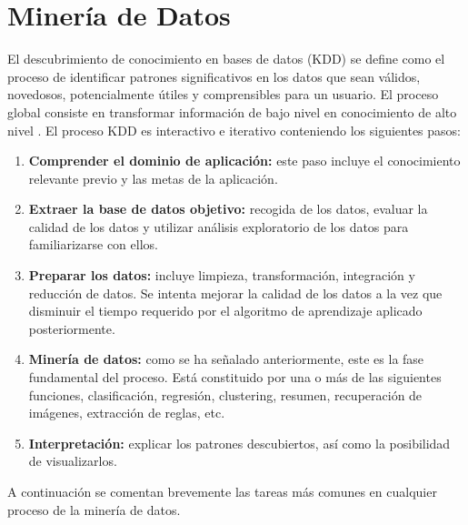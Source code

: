 \section{Minería de Datos}
El descubrimiento de conocimiento en bases de datos (KDD) se define como el proceso de identificar patrones significativos 
en los datos que sean válidos, novedosos, potencialmente útiles y comprensibles para un usuario. El proceso global consiste 
en transformar información de bajo nivel en conocimiento de alto nivel \cite{riquelme2006mineria}. El proceso KDD es interactivo e iterativo conteniendo
los siguientes pasos:
\begin{enumerate}
 \item \textbf{Comprender el dominio de aplicación:} este paso incluye el conocimiento relevante previo y las metas de la aplicación.
\item \textbf{Extraer la base de datos objetivo:} recogida de los datos, evaluar la calidad de los datos y utilizar análisis exploratorio de los datos para
familiarizarse con ellos.
\item \textbf{Preparar los datos:} incluye limpieza, transformación, integración y reducción de datos. Se intenta mejorar la calidad de los
datos a la vez que disminuir el tiempo requerido por el algoritmo de aprendizaje aplicado posteriormente.
\item \textbf{Minería de datos:} como se ha señalado anteriormente, este es la fase fundamental del proceso. Está constituido por una o más de
las siguientes funciones, clasificación, regresión, clustering, resumen, recuperación de imágenes, extracción de reglas, etc.
\item \textbf{Interpretación:} explicar los patrones descubiertos, así como la posibilidad de visualizarlos.
\end{enumerate}
A continuación se comentan brevemente las tareas más comunes en cualquier proceso de la minería de datos.

